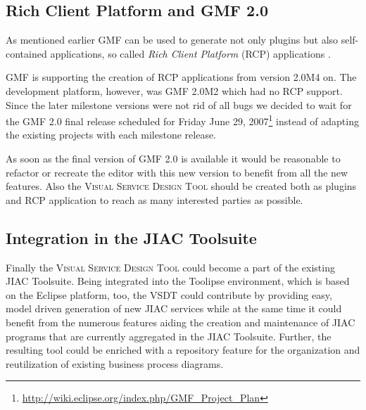 \subsection{Rich Client Platform and GMF 2.0}

As mentioned earlier GMF can be used to generate not only plugins but also self-contained applications, so called \emph{Rich Client Platform} (RCP) applications .

GMF is supporting the creation of RCP applications from version 2.0M4 on. The development platform, however, was GMF 2.0M2 which had no RCP support. Since the later milestone versions were not rid of all bugs we decided to wait for the GMF 2.0 final release scheduled for Friday June 29, 2007\footnote{\url{http://wiki.eclipse.org/index.php/GMF_Project_Plan}} instead of adapting the existing projects with each milestone release.

As soon as the final version of GMF 2.0 is available it would be reasonable to refactor or recreate the editor with this new version to benefit from all the new features. Also the \textsc{Visual Service Design Tool} should be created both as plugins and RCP application to reach as many interested parties as possible.


\subsection{Integration in the JIAC Toolsuite}

Finally the \textsc{Visual Service Design Tool} could become a part of the existing JIAC Toolsuite. Being integrated into the Toolipse environment, which is based on the Eclipse platform, too, the VSDT could contribute by providing easy, model driven generation of new JIAC services while at the same time it could benefit from the numerous features aiding the creation and maintenance of JIAC programs that are currently aggregated in the JIAC Toolsuite. Further, the resulting tool could be enriched with a repository feature for the organization and reutilization of existing business process diagrams.
